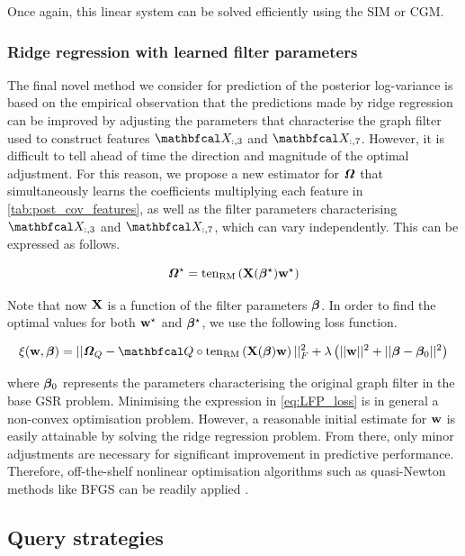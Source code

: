 Once again, this linear system can be solved efficiently using the SIM or CGM. 


\subsubsection{Ridge regression with learned filter parameters}

\label{sec:logvar_LFP}

The final novel method we consider for prediction of the posterior log-variance is based on the empirical observation that the predictions made by ridge regression can be improved by adjusting the parameters that characterise the graph filter used to construct features $\Xt_{:,3}$ and $\Xt_{:,7}$. However, it is difficult to tell ahead of time the direction and magnitude of the optimal adjustment. For this reason, we propose a new estimator for $\bm{\mathit{\Omega}}$ that simultaneously learns the coefficients multiplying each feature in \cref{tab:post_cov_features}, as well as the filter parameters characterising $\Xt_{:, 3}$ and $\Xt_{:, 7}$, which can vary independently. This can be expressed as follows. 

\begin{equation}
    \bm{\mathit{\Omega}}^\star = \text{\textup{ten}}_{\text{\textup{RM}}}\left(\mathbf{X}(\boldsymbol{\beta}^\star) \mathbf{w}^\star\right)
\end{equation}

Note that now $\mathbf{X}$ is a function of the filter parameters $\boldsymbol{\beta}$. In order to find the optimal values for both $\mathbf{w}^\star$ and $\boldsymbol{\beta}^\star$, we use the following loss function. 

\begin{equation}
    \label{eq:LFP_loss}
    \xi(\w, \betaa) = || \Omegat_Q - \Qt \circ \tenrm{\X(\betaa) \w} ||^2_F + \lambda \left(||\w||^2 + ||\betaa - \betaa_0 ||^2\right)
\end{equation}


where $\boldsymbol{\beta}_0$ represents the parameters characterising the original graph filter in the base GSR problem. Minimising the expression in \cref{eq:LFP_loss} is in general a non-convex optimisation problem. However, a reasonable initial estimate for $\mathbf{w}$ is easily attainable by solving the ridge regression problem. From there, only minor adjustments are necessary for significant improvement in predictive performance. Therefore, off-the-shelf nonlinear optimisation algorithms such as quasi-Newton methods like BFGS can be readily applied \citep{Fletcher2013}. 


\subsection{Query strategies}

